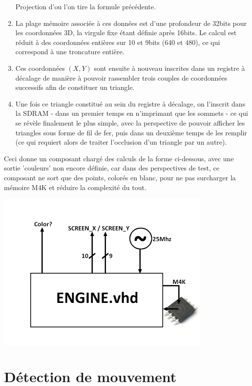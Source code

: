 \documentclass[10pt,a4paper]{report}
\begin{document}
\begin{enumerate}
Projection d'ou l'on tire la formule précédente.

\item La plage mémoire associée à ces données est d'une profondeur de 32bits pour les coordonnées 3D, la virgule fixe étant définie après 16bits. Le calcul est réduit à des coordonnées entières sur 10 et 9bits (640 et 480), ce qui correspond à une troncature entière.

\item Ces coordonnées $\left(X,Y\right)$ sont ensuite à nouveau inscrites dans un registre à décalage de manière à pouvoir rassembler trois couples de coordonnées successifs afin de constituer un triangle.

\item Une fois ce triangle constitué au sein du registre à décalage, on l'inscrit dans la SDRAM - dans un premier temps en n'imprimant que les sommets - ce qui se révèle finalement le plus simple, avec la perspective de pouvoir afficher les triangles sous forme de fil de fer, puis dans un deuxième temps de les remplir (ce qui requiert alors de traiter l'occlusion d'un triangle par un autre).

\end{enumerate}

Ceci donne un composant chargé des calculs de la forme ci-dessous, avec une sortie 'couleurs' non encore définie, car dans des perspectives de test, ce composant ne sort que des points, colorés en blanc, pour ne pas surcharger la mémoire M4K et réduire la complexité du tout.
\begin{center}
\includegraphics[width=300pt]{gfx/engine.png}
\end{center}

\section{Détection de mouvement}
\end{document}
